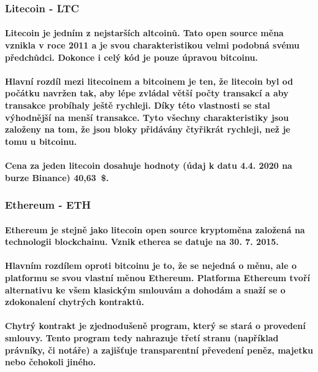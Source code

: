 \documentclass[thesis=B,czech]{FITthesis}[2019/03/21]
\begin{document}
\subsubsection{Litecoin - LTC}
\paragraph{
Litecoin je jedním z nejstarších altcoinů. Tato open source měna vznikla v roce 2011 a je svou charakteristikou velmi podobná svému předchůdci. \cite{litecoin} Dokonce i celý kód je pouze úpravou bitcoinu. \cite{alza_monero}
}
\paragraph{
Hlavní rozdíl mezi litecoinem a bitcoinem je ten, že litecoin byl od počátku navržen tak, aby lépe zvládal větší počty transakcí a aby transakce probíhaly ještě rychleji. Díky této vlastnosti se stal výhodnější na menší transakce. Tyto všechny charakteristiky jsou založeny na tom, že jsou bloky přidávány čtyřikrát rychleji, než je tomu u bitcoinu. \cite{litecoin}
}
\paragraph{
Cena za jeden litecoin dosahuje hodnoty (údaj k datu 4.4. 2020 na burze Binance) 40,63~\$. \cite{binance_markets}
}
\subsubsection{Ethereum - ETH}
\paragraph{
Ethereum je stejně jako litecoin open source kryptoměna založená na technologii blockchainu. Vznik etherea se datuje na 30. 7. 2015. 
}
\paragraph{
Hlavním rozdílem oproti bitcoinu je to, že se nejedná o měnu, ale o platformu se svou vlastní měnou Ethereum. Platforma Ethereum tvoří alternativu ke všem klasickým smlouvám a dohodám a snaží se o zdokonalení chytrých kontraktů. \cite{btc_vs_eth}
}
\paragraph{
Chytrý kontrakt je zjednodušeně program, který se stará o provedení smlouvy. Tento program tedy nahrazuje třetí stranu (například právníky, či notáře) a zajišťuje transparentní převedení peněz, majetku nebo čehokoli jiného. \cite{ethereum}
}
\end{document}

